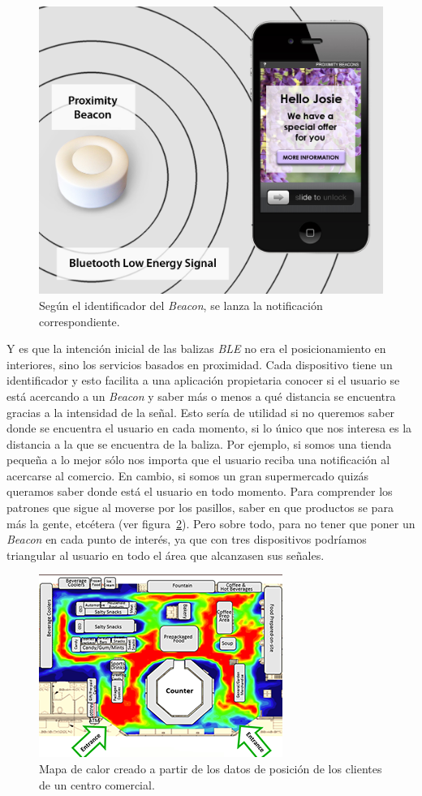 \begin{figure}[tbp]
\centering
\includegraphics[scale=0.2]{figures/proximity-beacon.png}
\caption{Según el identificador del \textit{Beacon}, se lanza la notificación correspondiente.\label{fig:proximity-beacon}}
\end{figure}

Y es que la intención inicial de las balizas \textit{BLE} no era el posicionamiento en interiores, sino los servicios basados en proximidad. Cada dispositivo tiene un identificador y esto facilita a una aplicación propietaria conocer si el usuario se está acercando a un \textit{Beacon} y saber más o menos a qué distancia se encuentra gracias a la intensidad de la señal. Esto sería de utilidad si no queremos saber donde se encuentra el usuario en cada momento, si lo único que nos interesa es la distancia a la que se encuentra de la baliza. Por ejemplo, si somos una tienda pequeña a lo mejor sólo nos importa que el usuario reciba una notificación al acercarse al comercio. En cambio, si somos un gran supermercado quizás queramos saber donde está el usuario en todo momento. Para comprender los patrones que sigue al moverse por los pasillos, saber en que productos se para más la gente, etcétera (ver figura~\ref{fig:heat-map}). Pero sobre todo, para no tener que poner un \textit{Beacon} en cada punto de interés, ya que con tres dispositivos podríamos triangular al usuario en todo el área que alcanzasen sus señales.

\begin{figure}[tbp]
\centering
\includegraphics[scale=1]{figures/heat-map.png}
\caption{Mapa de calor creado a partir de los datos de posición de los clientes de un centro comercial.\label{fig:heat-map}}
\end{figure}